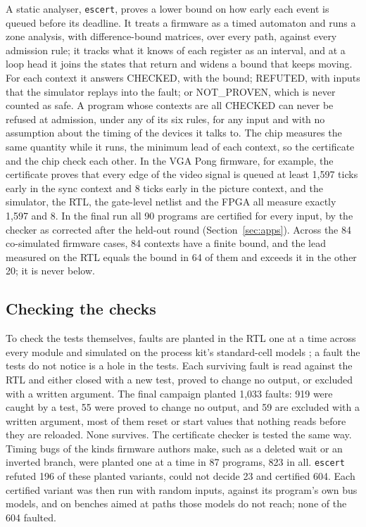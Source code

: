\documentclass[conference,letterpaper]{IEEEtran}
\begin{document}
A static analyser, \texttt{escert}, proves a lower bound on how early each event is
queued before its deadline. It treats a firmware as a timed automaton and runs a zone
analysis, with difference-bound matrices, over every path, against every admission rule;
it tracks what it knows of each register as an interval, and at a loop head it joins the
states that return and widens a bound that keeps moving. For each context it answers
CHECKED, with the bound; REFUTED, with inputs that the simulator replays into the fault;
or NOT\_PROVEN, which is never counted as safe. A program whose contexts are all CHECKED
can never be refused at admission, under any of its six rules, for any input and with no
assumption about the timing of the devices it talks to. The chip measures the same
quantity while it runs, the minimum lead of each context, so the certificate and the chip
check each other. In the VGA Pong firmware, for example, the certificate proves that every edge of
the video signal is queued at least 1{,}597 ticks early in the sync context and 8 ticks
early in the picture context, and the simulator, the RTL, the gate-level netlist and the
FPGA all measure exactly 1{,}597 and 8. In the final run all 90 programs are certified
for every input, by the checker as corrected after the held-out round
(Section~\ref{sec:apps}). Across the 84 co-simulated firmware cases, 84 contexts have a finite bound, and the lead measured on the RTL equals the bound in 64 of them and exceeds it in the other 20; it is never below.

\subsection{Checking the checks}

To check the tests themselves, faults are planted in the RTL one at a time across every
module and simulated on the process kit's standard-cell models \cite{mutation}; a fault
the tests do not notice is a hole in the tests. Each surviving fault is read against the
RTL and either closed with a new test, proved to change no output, or excluded with a
written argument. The final campaign planted 1,033 faults: 919 were caught by a test, 55 were proved to change no output, and 59 are excluded with a written argument, most of them reset or start values that nothing reads before they are reloaded. None survives.
The certificate checker is tested the same way. Timing bugs of the kinds firmware authors
make, such as a deleted wait or an inverted branch, were planted one at a time in 87
programs, 823 in all. \texttt{escert} refuted 196 of these planted variants, could not
decide 23 and certified 604. Each certified variant was then run with random inputs,
against its program's own bus models, and on benches aimed at paths those models do not
reach; none of the 604 faulted.
\end{document}
